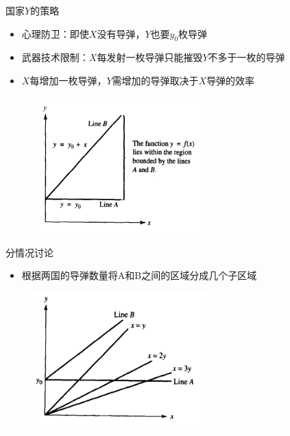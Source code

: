 \documentclass[UTF8]{ctexbeamer}
\begin{document}
\begin{frame}{国家$Y$的策略}
  \begin{itemize}
  \item 心理防卫：即使$X$没有导弹，$Y$也要$y_0$枚导弹
  \item 武器技术限制：$X$每发射一枚导弹只能摧毁$Y$不多于一枚的导弹
  \item $X$每增加一枚导弹，$Y$需增加的导弹取决于$X$导弹的效率
  \end{itemize}
  
  \begin{figure}
    \centering
    \includegraphics[width=0.6\textwidth]{region.png}
  \end{figure}
\end{frame}

\begin{frame}{分情况讨论}
  \begin{itemize}
  \item 根据两国的导弹数量将A和B之间的区域分成几个子区域
  \end{itemize}
  
  \begin{figure}
    \centering
    \includegraphics[width=0.6\textwidth]{case.png}
  \end{figure}
\end{frame}
\end{document}
